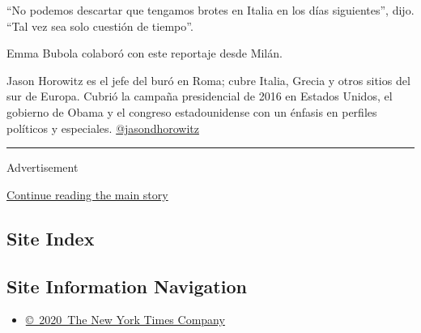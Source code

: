 ``No podemos descartar que tengamos brotes en Italia en los días
siguientes'', dijo. ``Tal vez sea solo cuestión de tiempo''.

Emma Bubola colaboró con este reportaje desde Milán.

Jason Horowitz es el jefe del buró en Roma; cubre Italia, Grecia y otros
sitios del sur de Europa. Cubrió la campaña presidencial de 2016 en
Estados Unidos, el gobierno de Obama y el congreso estadounidense con un
énfasis en perfiles políticos y especiales.
\href{https://twitter.com/jasondhorowitz}{@jasondhorowitz}

\begin{center}\rule{0.5\linewidth}{\linethickness}\end{center}

Advertisement

\protect\hyperlink{after-bottom}{Continue reading the main story}

\hypertarget{site-index}{%
\subsection{Site Index}\label{site-index}}

\hypertarget{site-information-navigation}{%
\subsection{Site Information
Navigation}\label{site-information-navigation}}

\begin{itemize}
\tightlist
\item
  \href{https://help.nytimes3xbfgragh.onion/hc/en-us/articles/115014792127-Copyright-notice}{©~2020~The
  New York Times Company}
\end{itemize}

